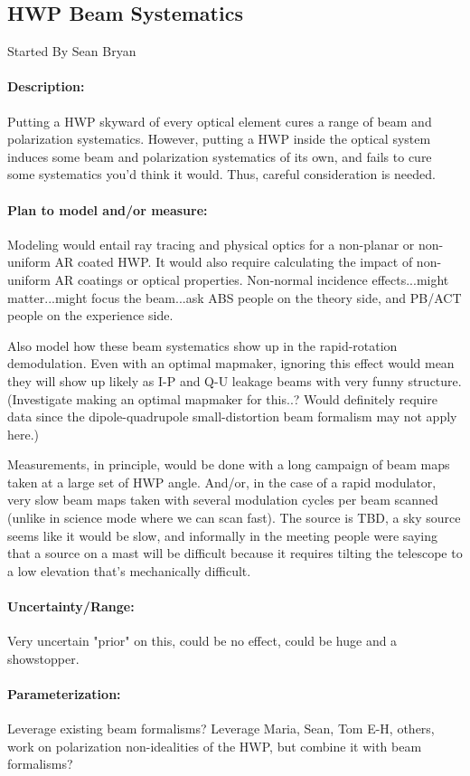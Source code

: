 
\subsection{HWP Beam Systematics}

Started By Sean Bryan

\paragraph{Description:}
Putting a HWP skyward of every optical element cures a range of beam and polarization systematics. However, putting a HWP inside the optical system induces some beam and polarization systematics of its own, and fails to cure some systematics you'd think it would. Thus, careful consideration is needed.

\paragraph{Plan to model and/or measure:}
Modeling would entail ray tracing and physical optics for a non-planar or non-uniform AR coated HWP. It would also require calculating the impact of non-uniform AR coatings or optical properties. Non-normal incidence effects...might matter...might focus the beam...ask ABS people on the theory side, and PB/ACT people on the experience side.

Also model how these beam systematics show up in the rapid-rotation demodulation. Even with an optimal mapmaker, ignoring this effect would mean they will show up likely as I-P and Q-U leakage beams with very funny structure. (Investigate making an optimal mapmaker for this..? Would definitely require data since the dipole-quadrupole small-distortion beam formalism may not apply here.)

Measurements, in principle, would be done with a long campaign of beam maps taken at a large set of HWP angle. And/or, in the case of a rapid modulator, very slow beam maps taken with several modulation cycles per beam scanned (unlike in science mode where we can scan fast). The source is TBD, a sky source seems like it would be slow, and informally in the meeting people were saying that a source on a mast will be difficult because it requires tilting the telescope to a low elevation that's mechanically difficult.

\paragraph{Uncertainty/Range:}
Very uncertain "prior" on this, could be no effect, could be huge and a showstopper.

\paragraph{Parameterization:}

Leverage existing beam formalisms? Leverage Maria, Sean, Tom E-H, others, work on polarization non-idealities of the HWP, but combine it with beam formalisms?
